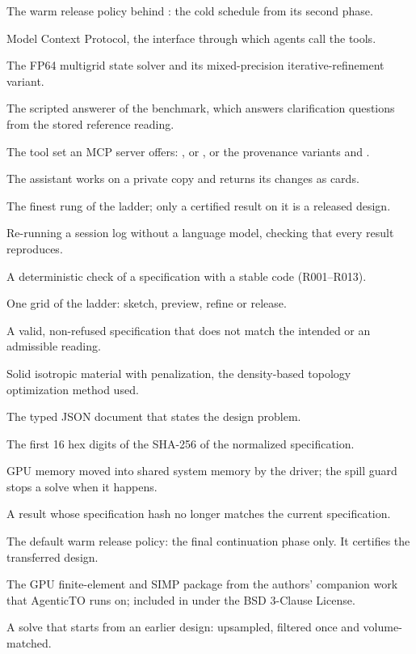 \begin{description}[style=nextline,leftmargin=0pt,itemsep=0.35em]
\item[Long re-opening] The warm release policy behind : the cold schedule from its second phase.
\item[MCP] Model Context Protocol, the interface through which agents call the tools.
\item[\code{mg64}, \code{mg\_ir}] The FP64 multigrid state solver and its mixed-precision iterative-refinement variant.
\item[Oracle] The scripted answerer of the benchmark, which answers clarification questions from the stored reference
reading.
\item[Profile] The tool set an MCP server offers: ,  or , or the provenance
variants  and .
\item[Propose mode] The assistant works on a private copy and returns its changes as cards.
\item[Release rung] The finest rung of the ladder; only a certified result on it is a released design.
\item[Replay] Re-running a session log without a language model, checking that every result reproduces.
\item[Rule] A deterministic check of a specification with a stable code (R001--R013).
\item[Rung] One grid of the ladder: sketch, preview, refine or release.
\item[Silent wrong] A valid, non-refused specification that does not match the intended or an admissible reading.
\item[SIMP] Solid isotropic material with penalization, the density-based topology optimization method used.
\item[Specification] The typed JSON document  that states the design problem.
\item[Spec hash] The first 16 hex digits of the SHA-256 of the normalized specification.
\item[Spill] GPU memory moved into shared system memory by the driver; the spill guard stops a solve when it happens.
\item[Stale] A result whose specification hash no longer matches the current specification.
\item[Tail] The default warm release policy: the final continuation phase only. It certifies the transferred design.
\item[\code{voxfem}] The GPU finite-element and SIMP package from the authors' companion work that AgenticTO runs on;
included in  under the BSD 3-Clause License.
\item[Warm start] A solve that starts from an earlier design: upsampled, filtered once and volume-matched.
\end{description}
